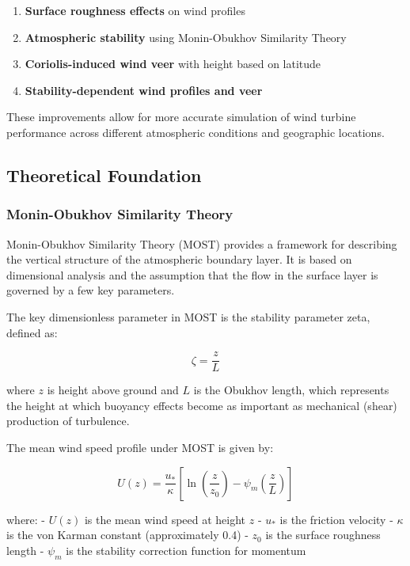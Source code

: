 \documentclass{article}
\begin{document}
\begin{enumerate}[label=\arabic*.]
\item
  \textbf{Surface roughness effects} on wind profiles
\item
  \textbf{Atmospheric stability} using Monin-Obukhov Similarity Theory
\item
  \textbf{Coriolis-induced wind veer} with height based on latitude
\item
  \textbf{Stability-dependent wind profiles and veer}
\end{enumerate}

These improvements allow for more accurate simulation of wind turbine
performance across different atmospheric conditions and geographic
locations.

\hypertarget{theoretical-foundation}{%
\subsection{Theoretical Foundation}\label{theoretical-foundation}}

\hypertarget{monin-obukhov-similarity-theory}{%
\subsubsection{Monin-Obukhov Similarity
Theory}\label{monin-obukhov-similarity-theory}}

Monin-Obukhov Similarity Theory (MOST) provides a framework for
describing the vertical structure of the atmospheric boundary layer. It
is based on dimensional analysis and the assumption that the flow in the
surface layer is governed by a few key parameters.

The key dimensionless parameter in MOST is the stability parameter zeta,
defined as:

\[\zeta = \frac{z}{L}\]

where \(z\) is height above ground and \(L\) is the Obukhov length,
which represents the height at which buoyancy effects become as
important as mechanical (shear) production of turbulence.

The mean wind speed profile under MOST is given by:

\[U(z) = \frac{u_*}{\kappa} \left[ \ln\left(\frac{z}{z_0}\right) - \psi_m\left(\frac{z}{L}\right) \right]\]

where: - \(U(z)\) is the mean wind speed at height \(z\) - \(u_*\) is
the friction velocity - \(\kappa\) is the von Karman constant
(approximately 0.4) - \(z_0\) is the surface roughness length -
\(\psi_m\) is the stability correction function for momentum
\end{document}
